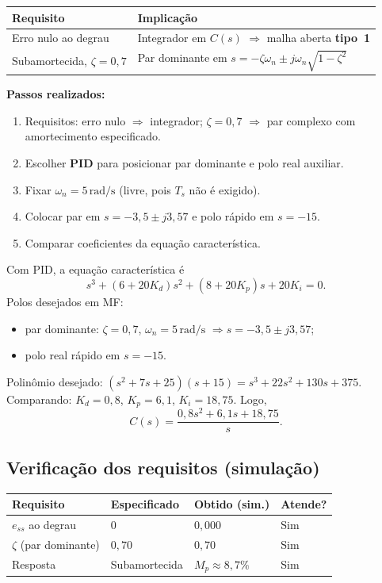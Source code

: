 \documentclass[11pt,a4paper]{article}
\begin{document}
\begin{center}
\begin{tabular}{@{}ll@{}}
  \toprule
  Requisito & Implicação \\
  \midrule
  Erro nulo ao degrau & Integrador em $C(s)$ $\Rightarrow$ malha aberta \textbf{tipo~1} \\
  Subamortecida, $\zeta=0{,}7$ & Par dominante em
  $s=-\zeta\omega_n\pm j\omega_n\sqrt{1-\zeta^2}$ \\
  \bottomrule
\end{tabular}
\end{center}

\textbf{Passos realizados:}
\begin{enumerate}[leftmargin=*]
  \item Requisitos: erro nulo $\Rightarrow$ integrador; $\zeta=0{,}7$
        $\Rightarrow$ par complexo com amortecimento especificado.
  \item Escolher \textbf{PID} para posicionar par dominante e polo real auxiliar.
  \item Fixar $\omega_n=5\,\mathrm{rad/s}$ (livre, pois $T_s$ não é exigido).
  \item Colocar par em $s=-3{,}5\pm j3{,}57$ e polo rápido em $s=-15$.
  \item Comparar coeficientes da equação característica.
\end{enumerate}

Com PID, a equação característica é
\[
  s^3+(6+20K_d)s^2+(8+20K_p)s+20K_i=0.
\]
Polos desejados em MF:
\begin{itemize}
  \item par dominante: $\zeta=0{,}7$, $\omega_n=5\,\mathrm{rad/s}$
        $\Rightarrow s=-3{,}5\pm j3{,}57$;
  \item polo real rápido em $s=-15$.
\end{itemize}
Polinômio desejado: $(s^2+7s+25)(s+15)=s^3+22s^2+130s+375$. Comparando:
$K_d=0{,}8$, $K_p=6{,}1$, $K_i=18{,}75$. Logo,
\[
  C(s)=\frac{0{,}8s^2+6{,}1s+18{,}75}{s}.
\]

\subsection*{Verificação dos requisitos (simulação)}

\begin{center}
\small
\begin{tabular}{@{}llll@{}}
  \toprule
  Requisito & Especificado & Obtido (sim.) & Atende? \\
  \midrule
  $e_{ss}$ ao degrau & $0$ & $0{,}000$ & Sim \\
  $\zeta$ (par dominante) & $0{,}70$ & $0{,}70$ & Sim \\
  Resposta & Subamortecida & $M_p\approx 8{,}7\%$ & Sim \\
  \bottomrule
\end{tabular}
\end{center}
\end{document}
